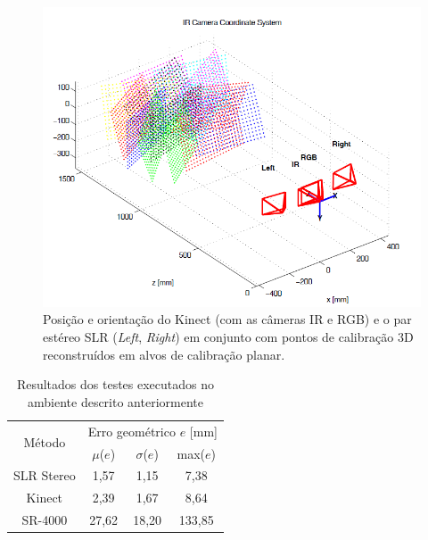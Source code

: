 \begin{figure}[!h]
	\centering
	\includegraphics[width=1\linewidth]{figs/ambientekinect.png}
	\caption{%
	Posição e orientação do Kinect (com as câmeras IR e RGB) e o par estéreo SLR (\emph{Left}, \emph{Right}) em conjunto com pontos de calibração 3D reconstruídos em alvos de calibração planar.
	}\label{fig:ambienteKinect}
\end{figure}

\begin{table}[htbp]
\caption{Resultados dos testes executados no ambiente descrito anteriormente}
\label{tab:resultadosKinect}
\begin{center}
\begin{tabular}{|c|c|c|c|}
\hline
\multirow{2}{1.5cm}{Método}& \multicolumn{3}{p{5cm}|}{Erro geométrico $e$ [mm]} \bigstrut \\
\cline{2-4} & \multicolumn{1}{c|}{$\mu$($e$)} & \multicolumn{1}{c|}{$\sigma$($e$)} & \multicolumn{1}{c|}{max($e$)} \bigstrut \\ \hline
SLR Stereo & 1,57 & 1,15 & 7,38 \bigstrut \\ \hline
Kinect & 2,39 & 1,67 & 8,64 \bigstrut \\ \hline
SR-4000 & 27,62 & 18,20 & 133,85 \bigstrut \\ 
\hline
\end{tabular}
\end{center}
\end{table}

